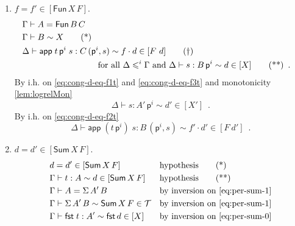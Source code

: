 \documentclass{LMCS}
\theoremstyle{plain}\newtheorem{satz}[thm]{Satz}
\newcommand{\proofLine}[2]{&#1&&\text{#2}}
\newcommand{\tfst}{\mathsf{fst}}
\newcommand{\tsnd}{\mathsf{snd}}
\newcommand{\exsubs}[2]{( #1, #2)}
\newcommand{\subsTm}[2]{#1\,#2}
\newcommand{\subsTy}[2]{#1\,#2}
\newcommand{\F}[2]{\mathsf{Fun}\,#1\,#2}
\newcommand{\DSum}[2]{\Sigma\,#1\,#2}
\newcommand{\p}{\mathsf{p}}
\newcommand{\appTm}[2]{\mathsf{app}\;#1\;#2} \newcommand{\singTm}[2]{\{#1\}_{#2}}
\newcommand{\dfst}[1]{\mathsf{fst}\;#1}
\newcommand{\dtype}[2]{#1\vdash#2}
\newcommand{\dterm}[3]{#1\vdash#3:#2}
\newcommand{\deqtype}[3]{#1\vdash#2=#3}
\newcommand{\lift}[2]{\subsTm{#2}{\p^{#1}}}
\newcommand{\perT}{\mathcal{T}}
\newcommand{\rel}{\sim}
\newcommand{\iPi}[2]{\mathsf{Fun}\,#1\,#2}
\newcommand{\iSing}[2]{\mathsf{Sing}\,#1\,{#2}}
\newcommand{\iDs}[2]{\mathsf{Sum}\,#1\,#2}
\newcommand{\fstnew}{\tfst\,}\newcommand{\sndnew}{\tsnd\,}
\begin{document}
{\begin{enumerate}[(a)]
\begin{enumerate}[(1)]
\begin{align*}
        \proofLine{\deqtype{\Gamma}{A}{\singTm{b}{B}}}{by hypothesis} \\
        \proofLine{\dtype{\Gamma}{B}\rel X \in \perT}{by hypothesis} \tag{*}\label{eq:cong-d-eq-s1t}\\
        \proofLine{\dterm{\Gamma}{B}{t}\rel d\in [X]}{by hypothesis} \tag{\textdagger}\label{eq:cong-d-eq-s2t}\\
        \proofLine{e' = d \in [X]}{by def. of $e=e' \in [\iSing{d}{X}]$} \tag{**}\label{eq:cong-d-eq-s3t}\\
        \proofLine{\dterm{\Gamma}{B}{t}\rel e'\in [X]}{by i.h. on \eqref{eq:cong-d-eq-s1t}, \eqref{eq:cong-d-eq-s2t}, and
        \eqref{eq:cong-d-eq-s3t}, }
      \end{align*}      
  \item $f = f' \in [\iPi{X}{F}]$.
      \begin{align*}
      &\deqtype{\Gamma}{A}{\F{B}{C}} &\\
      &\dtype{\Gamma}{B}\rel X \tag{*}\label{eq:cong-d-eq-f1t}&\\
      &\dterm{\Delta}{\subsTy{C}{\exsubs{\p^i}{s}}}{\appTm{\lift{i}{t}}{s}} \rel f\cdot d \in [F\ d]
      \tag{\textdagger}\label{eq:cong-d-eq-f2t}\\
      & \text{\hspace{3cm} for all }\Delta\leqslant^i\Gamma \text{ and }
      \dterm{\Delta}{\lift{i}{B}}{s} \rel d\in [X] \tag{**}\label{eq:cong-d-eq-f3t} \enspace .
      \end{align*}
      By i.h. on \eqref{eq:cong-d-eq-f1t} and \eqref{eq:cong-d-eq-f3t}
      and monotonicity \ref{lem:logrelMon}
      \[\dterm{\Delta}{\lift{i}{A'}}{s} \rel d' \in [X'] \enspace .\]
      By i.h. on \eqref{eq:cong-d-eq-f2t}
      \[\dterm{\Delta}{\subsTy{B}{\exsubs{\p^i}{s}}}
      {\appTm{(\lift{i}{t})}{s}}\rel f'\cdot d' \in [F\ d'] \enspace .\]
  \item $d = d' \in [\iDs{X}{F}]$.
    \begin{align*}
      \proofLine{d = d' \in [\iDs{X}{F}]}{hypothesis}\tag{*}\label{eq:per-sum-0}\\
      \proofLine{\dterm{\Gamma}{A}{t} \rel d\in [\iDs{X}{F}]}{hypothesis}\tag{**}\label{eq:per-sum-1} \\
      \proofLine{\deqtype{\Gamma}{A}{\DSum{A'}{B}}}{by inversion on \eqref{eq:per-sum-1}}\\
      \proofLine{\dtype{\Gamma}{\DSum{A'}{B}}\rel \iDs{X}{F}\in \perT}{by inversion on \eqref{eq:per-sum-1}}\\
      \proofLine{\dterm{\Gamma}{A'}{\dfst{t}} \rel \fstnew{d}\in [X]}{by inversion on \eqref{eq:per-sum-0}}

\end{align*}
\end{enumerate}
\end{enumerate}}
\end{document}
